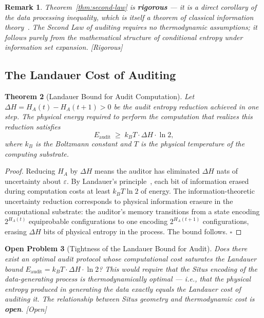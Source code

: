 \documentclass[12pt,a4paper]{article}
\newtheorem{theorem}{Theorem}[section]
\newtheorem{remark}[theorem]{Remark}
\newtheorem{openproblem}[theorem]{Open Problem}
\newcommand{\rigorous}{\textcolor{green!50!black}{\small\textsf{[Rigorous]}}}
\newcommand{\openquest}{\textcolor{red!70!black}{\small\textsf{[Open]}}}
\begin{document}
\begin{remark}
Theorem~\ref{thm:second-law} is \textbf{rigorous} — it is a direct corollary
of the data processing inequality, which is itself a theorem of classical
information theory~\citep{cover1999elements}.  The Second Law of auditing
requires no thermodynamic assumptions; it follows purely from the
mathematical structure of conditional entropy under information set expansion.
\rigorous
\end{remark}

\subsection{The Landauer Cost of Auditing}

\begin{theorem}[Landauer Bound for Audit Computation]
\label{thm:landauer}
Let $\Delta H = H_A(t) - H_A(t+1) > 0$ be the audit entropy reduction achieved
in one step.  The physical energy required to perform the computation that
realizes this reduction satisfies
\begin{equation}\label{eq:landauer-cost}
    E_{\mathrm{audit}} \;\geq\;
    k_B T \cdot \Delta H \cdot \ln 2,
\end{equation}
where $k_B$ is the Boltzmann constant and $T$ is the physical temperature of
the computing substrate.
\end{theorem}

\begin{proof}
Reducing $H_A$ by $\Delta H$ means the auditor has eliminated $\Delta H$ nats
of uncertainty about $\varepsilon$.  By Landauer's principle~\citep{landauer1961irreversibility},
each bit of information erased during computation costs at least $k_B T\ln2$
of energy.  The information-theoretic uncertainty reduction corresponds to
physical information erasure in the computational substrate: the auditor's
memory transitions from a state encoding $2^{H_A(t)}$ equiprobable
configurations to one encoding $2^{H_A(t+1)}$ configurations, erasing
$\Delta H$ bits of physical entropy in the process.  The bound follows.
$\square$
\end{proof}

\begin{openproblem}[Tightness of the Landauer Bound for Audit]
\label{prob:landauer-tight}
Does there exist an optimal audit protocol whose computational cost
\emph{saturates} the Landauer bound $E_{\mathrm{audit}} = k_B T\cdot\Delta H\cdot\ln2$?
This would require that the Situs encoding of the data-generating process is
thermodynamically optimal — i.e., that the physical entropy produced in
generating the data exactly equals the Landauer cost of auditing it.  The
relationship between Situs geometry and thermodynamic cost is \textbf{open}.
\openquest
\end{openproblem}
\end{document}
